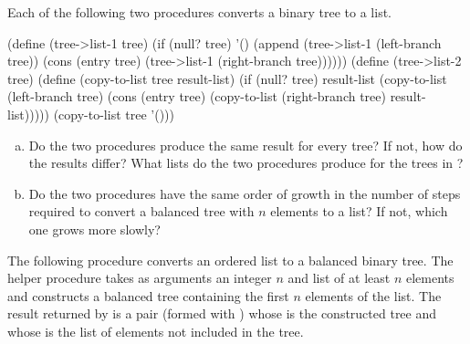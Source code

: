 \begin{exerciseGroup}
\label{Exercise 2.63}
 Each of the following two
procedures converts a binary tree to a list.

\begin{codeBlock}
(define (tree->list-1 tree)
  (if (null? tree)
      '()
      (append (tree->list-1 (left-branch tree))
              (cons (entry tree)
                    (tree->list-1
                      (right-branch tree))))))
(define (tree->list-2 tree)
  (define (copy-to-list tree result-list)
    (if (null? tree)
        result-list
        (copy-to-list (left-branch tree)
                      (cons (entry tree)
                            (copy-to-list
                              (right-branch tree)
                              result-list)))))
  (copy-to-list tree '()))
\end{codeBlock}

\begin{enumerate}[a.]

\item
Do the two procedures produce the same result for every tree?  If not, how do
the results differ?  What lists do the two procedures produce for the trees in
?

\item
Do the two procedures have the same order of growth in the number of steps
required to convert a balanced tree with \( n \) elements to a list?  If not,
which one grows more slowly?

\end{enumerate}

\label{Exercise 2.64}
 The following procedure
 converts an ordered list to a balanced binary tree.  The
helper procedure  takes as arguments an integer \( n \) and
list of at least \( n \) elements and constructs a balanced tree containing the
first \( n \) elements of the list.  The result returned by 
is a pair (formed with ) whose  is the constructed tree
and whose  is the list of elements not included in the tree.


\end{exerciseGroup}
